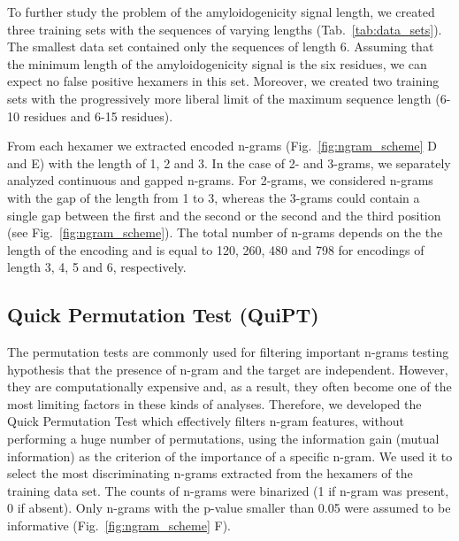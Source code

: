 \documentclass[fleqn,10pt,twoside]{gcb15submission}
\begin{document}
  To further study the problem of the amyloidogenicity signal length, we created 
three training sets with the sequences of varying lengths 
%
%
%
%
%
(Tab.~\ref{tab:data_sets}). The smallest data set contained only the sequences 
of length 6. Assuming that the minimum length of the amyloidogenicity signal is 
the six residues, we can expect no false positive hexamers in this set. Moreover, we created 
two training sets with the progressively more liberal limit of the maximum 
sequence length (6-10 residues and 6-15 residues).

  From each hexamer we extracted encoded n-grams (Fig.~\ref{fig:ngram_scheme} D and E) with 
the length of 1, 2 and 3. In the case of 2- and 3-grams, we separately analyzed 
continuous and gapped n-grams. 
For 2-grams, we considered n-grams with the gap of the length from 1 to 3, 
whereas the 3-grams could contain a single gap between the first and the second 
or the second and the third position (see Fig.~\ref{fig:ngram_scheme}). The 
total number of n-grams depends on the the length of the encoding and is equal 
to 120, 260, 480 and 798 for encodings of length 3, 4, 5 and 6, respectively.


\subsection{Quick Permutation Test (QuiPT)}

  The permutation tests are commonly used for filtering important n-grams 
testing hypothesis that the presence of n-gram and the target are independent. 
However, they are computationally expensive and, as a result, they often become 
one of the most limiting factors in these kinds of analyses. Therefore, we 
developed the Quick Permutation Test which effectively filters n-gram features, 
without performing a huge number of permutations, using the information gain 
(mutual information) as the criterion of the importance of a specific n-gram. We 
used it to select the most discriminating n-grams extracted from the hexamers of 
the training data set. The counts of n-grams were binarized (1 if n-gram was 
present, 0 if absent). Only n-grams with the p-value smaller than 0.05 were 
assumed to be informative (Fig.~\ref{fig:ngram_scheme} F). 
%
%
%
%
%
\end{document}
